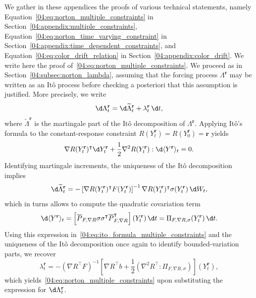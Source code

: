 We gather in these appendices the proofs of various technical statements, namely Equation~\eqref{04:eq:norton_multiple_constraints} in Section~\ref{04:appendix:multiple_constraints}, Equation~\eqref{04:eq:norton_time_varying_constraint} in Section~\ref{04:appendix:time_dependent_constraints}, and Equation~\eqref{04:eq:color_drift_relation} in Section~\ref{04:appendix:color_drift}. 
\label{04:appendix:multiple_constraints}
We write here the proof of~\eqref{04:eq:norton_multiple_constraints}.
We proceed as in Section~\ref{04:subsec:norton_lambda}, assuming that the forcing process $\Lambda^{\mathbf r}$ may be written as an Itô process before checking a posteriori that this assumption is justified. More precisely, we write
\[\d \Lambda_t^{\mathbf r} = \d \widetilde{\Lambda}_t^{\mathbf r} + \lambda^{\mathbf r}_t \, \d t,\]
where $\widetilde{\Lambda}^{\mathbf r}$ is the martingale part of the Itô decomposition of $\Lambda^{\mathbf r}$.
Applying Itô's formula to the constant-response constraint $R(Y^{\mathbf r}_t) = R(Y^{\mathbf r}_0)=\mathbf{r}$ yields
\begin{equation}\label{04:eq:ito_formula_multiple_constraints}\nabla R(Y^{\mathbf r}_t)^\intercal\d Y^{\mathbf r}_t + \frac12\nabla^2 R(Y^{\mathbf r}_t) : \d \langle Y^{\mathbf r}\rangle_t = 0.\end{equation}
Identifying martingale increments, the uniqueness of the Itô decomposition implies
\[\d \widetilde{\Lambda}_t^{\mathbf r} = - \left[\nabla R(Y_t^{\mathbf{r}})^\intercal F(Y_t^{\mathbf{r}})\right]^{-1}\nabla R(Y_t^{\mathbf{r}})^\intercal \sigma(Y_t^{\mathbf r}) \,\d W_t,\]
which in turns allows to compute the quadratic covariation term
\[\d \langle Y^{\mathbf r}\rangle_t = \left[\overline{P}_{F,\nabla R} \sigma\sigma ^\intercal \overline{P}_{F,\nabla R}^\intercal\right](Y_t^{\mathbf r})\,\d  t = \Pi_{F,\nabla R,\sigma}(Y_t^{\mathbf r})\, \d t.\]
Using this expression in~\eqref{04:eq:ito_formula_multiple_constraints} and the uniqueness of the Itô decomposition once again to identify bounded-variation parts, we recover
\[\lambda_t^{\mathbf r} = - (\nabla R^\intercal F)^{-1}\left[\nabla R^\intercal b +\frac12\left(\nabla^2 R^\intercal : \Pi_{F,\nabla R,\sigma}\right)\right] (Y_t^{\mathbf{r}}),\]
which yields~\eqref{04:eq:norton_multiple_constraints} upon substituting the expression for $\d\Lambda_t^{\mathbf r}$.

